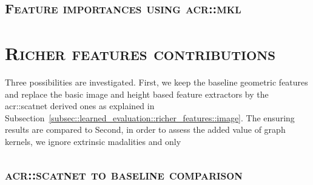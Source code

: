         \begin{figure}[htpb]
            \centering
        \end{figure}

    \subsection{\textsc{Feature importances using \acrshort*{acr::mkl}}}
    
\section{\textsc{Richer features contributions}}
    \label{sec::more_experiments::richer_features}
    Three possibilities are investigated.
    First, we keep the baseline geometric features and replace the basic image and height based feature extractors by the \gls{acr::scatnet} derived ones as explained in Subsection~\ref{subsec::learned_evaluation::richer_features::image}.
    The ensuring results are compared to 
    Second, in order to assess the added value of graph kernels, we ignore extrinsic madalities and only 

    \subsection{\textsc{\acrshort*{acr::scatnet} to baseline comparison}}
        \label{subsec::more_experiments::richer_features::scatnet_baseline}

